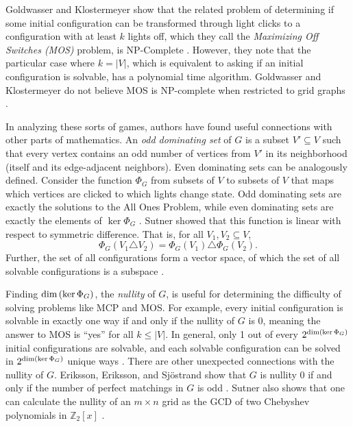\documentclass[a4paper]{article}
\newcommand{\Z}{\mathbb{Z}}
\newcommand{\abs}[1]{\left| #1 \right|}
\renewcommand{\dim}[1]{\textnormal{dim}\left( #1 \right)}
\begin{document}
	Goldwasser and Klostermeyer show that the related problem of determining if some initial configuration can be transformed through light clicks to a configuration with at least $k$ lights off, which they call the \textit{Maximizing Off Switches (MOS)} problem, is NP-Complete \cite{Goldwasser2000}.
	However, they note that the particular case where $k = \abs{V}$, which is equivalent to asking if an initial configuration is solvable, has a polynomial time algorithm.
	Goldwasser and Klostermeyer do not believe MOS is NP-complete when restricted to grid graphs \cite{Goldwasser2000}.
	
	In analyzing these sorts of games, authors have found useful connections with other parts of mathematics.
	An \textit{odd dominating set} of $G$ is a subset $V' \subseteq V$ such that every vertex contains an odd number of vertices from $V'$ in its neighborhood (itself and its edge-adjacent neighbors).
	Even dominating sets can be analogously defined.
	Consider the function $\Phi_G$ from subsets of $V$ to subsets of $V$ that maps which vertices are clicked to which lights change state.
	Odd dominating sets are exactly the solutions to the All Ones Problem, while even dominating sets are exactly the elements of $\ker{\Phi_G}$ \cite{Sutner1989}.
	Sutner showed that this function is linear with respect to symmetric difference.
	That is, for all $V_1, V_2 \subseteq V$,
	\begin{equation*}
		\Phi_G(V_1 \triangle V_2) = \Phi_G(V_1) \triangle \Phi_G(V_2).
	\end{equation*}
	Further, the set of all configurations form a vector space, of which the set of all solvable configurations is a subspace \cite{Sutner1988}. 
	
	Finding $\dim{\ker{\Phi_G}}$, the \textit{nullity} of $G$, is useful for determining the difficulty of solving problems like MCP and MOS. 
	For example, every initial configuration is solvable in exactly one way if and only if the nullity of $G$ is 0, meaning the answer to MOS is ``yes'' for all $k \leq \abs{V}$.
	In general, only 1 out of every $2^{\dim{\ker{\Phi_G}}}$ initial configurations are solvable, and each solvable configuration can be solved in $2^{\dim{\ker{\Phi_G}}}$ unique ways \cite{Sutner1989}.
	There are other unexpected connections with the nullity of $G$.
	Eriksson, Eriksson, and Sjöstrand show that $G$ is nullity 0 if and only if the number of perfect matchings in $G$ is odd \cite{ERIKSSON2001357}.
	Sutner also shows that one can calculate the nullity of an $m \times n$ grid as the GCD of two Chebyshev polynomials in $\Z_2[x]$ \cite{Sutner2000}.
	
\end{document}
